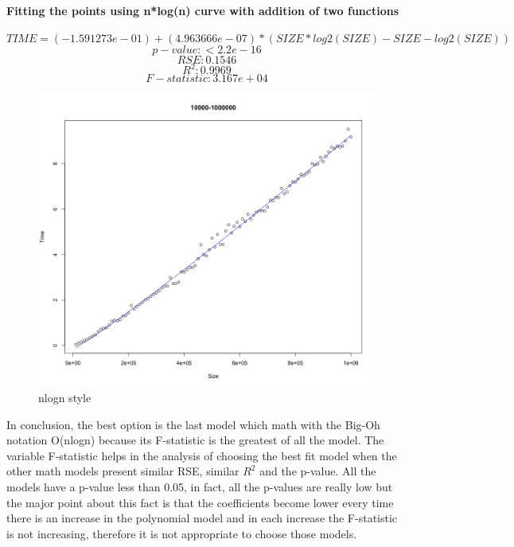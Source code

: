\documentclass[14pt, oneside]{article}
\begin{document}
\paragraph{Fitting the points using n*log(n) curve with addition of two functions}

$$ TIME =  (-1.591273e-01 ) + (4.963666e-07)*(SIZE*log2(SIZE) - SIZE - log2(SIZE))$$
$$ p-value: < 2.2e-16 $$
$$ RSE: 0.1546$$
$$ R^{2}:  0.9969$$
$$ F-statistic: 3.167e+04$$

\begin{figure}[H]
\centering
\includegraphics[width=\linewidth]{Rplot10.png}
\caption{nlogn style}
\end{figure}

In conclusion, the best option is the last model which math with the Big-Oh notation O(nlogn) because its F-statistic is the greatest of all the model. The variable F-statistic helps in the analysis of choosing the best fit model
when the other math models present similar RSE, similar $R^{2}$ and the p-value. All the models have a p-value less than 0.05, in fact, all the p-values are really low but the major point about this fact is that the coefficients
become lower every time there is an increase in the polynomial model and in each increase the F-statistic is not increasing, therefore it is not appropriate to choose those models.
\end{document}
